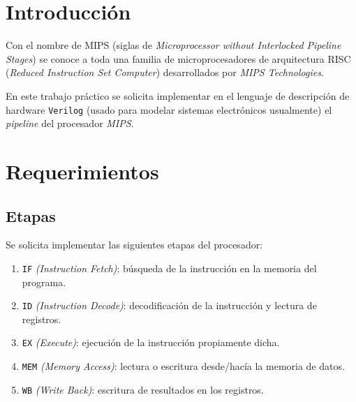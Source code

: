 \documentclass[a4paper]{article}
\begin{document}
\tableofcontents

%
%
%
%

\clearpage

\section{Introducción}
Con el nombre de MIPS (siglas de \textit{Microprocessor without Interlocked Pipeline Stages}) se conoce a toda una familia de microprocesadores de arquitectura RISC (\textit{Reduced Instruction Set Computer}) desarrollados por \textit{MIPS Technologies}.

En este trabajo práctico se solicita implementar en el lenguaje de descripción de hardware \texttt{Verilog}  (usado para modelar sistemas electrónicos usualmente) el \textit{pipeline} del procesador \textit{MIPS}.

\section{Requerimientos}
\subsection{Etapas}
Se solicita implementar las siguientes etapas del procesador:
\begin{enumerate}
	\item \texttt{IF} \textit{(Instruction Fetch)}: búsqueda de la instrucción en la memoria del programa.
	\item \texttt{ID} \textit{(Instruction Decode)}: decodificación de la instrucción y lectura de registros.
	\item \texttt{EX} \textit{(Execute)}: ejecución de la instrucción propiamente dicha.
	\item \texttt{MEM} \textit{(Memory Access)}: lectura o escritura desde/hacía la memoria de datos.
	\item \texttt{WB} \textit{(Write Back)}: escritura de resultados en los registros.
\end{enumerate}
\end{document}
